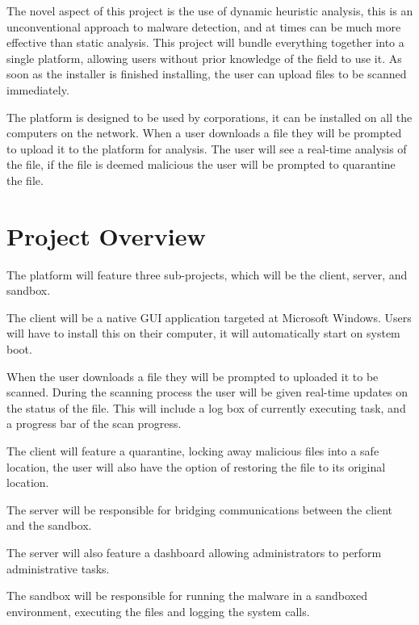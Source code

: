 The novel aspect of this project is the use of dynamic heuristic analysis,
this is an unconventional approach to malware detection,
and at times can be much more effective than static analysis.
This project will bundle everything together into a single platform,
allowing users without prior knowledge of the field to use it.
As soon as the installer is finished installing,
the user can upload files to be scanned immediately.

The platform is designed to be used by corporations,
it can be installed on all the computers on the network.
When a user downloads a file they will be prompted to upload it to the platform for analysis.
The user will see a real-time analysis of the file,
if the file is deemed malicious the user will be prompted to quarantine the file.




\section{Project Overview}
The platform will feature three sub-projects, which will be the client, server, and sandbox.

The client will be a native GUI application targeted at Microsoft Windows.
Users will have to install this on their computer,
it will automatically start on system boot.

When the user downloads a file they will be prompted to uploaded it to be scanned.
During the scanning process the user will be given real-time updates on the status of the file.
This will include a log box of currently executing task, and a progress bar of the scan progress.

The client will feature a quarantine, locking away malicious files into a safe location,
the user will also have the option of restoring the file to its original location.

The server will be responsible for bridging communications between the client and the sandbox.

The server will also feature a dashboard allowing administrators to perform administrative tasks.

The sandbox will be responsible for running the malware in a sandboxed environment,
executing the files and logging the system calls.


